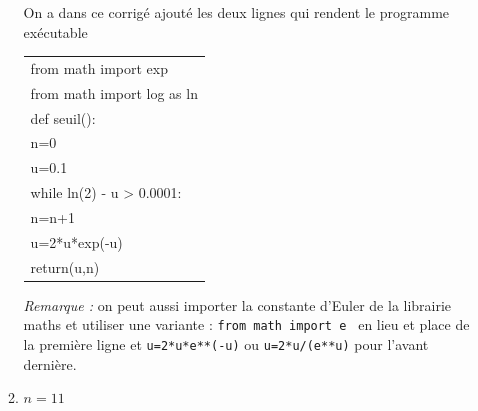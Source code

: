 \documentclass[10pt]{article}
\providecommand{\red}{\color{red}}
\providecommand{\red}{\color{red}}
\begin{document}
\begin{enumerate}
\begin{enumerate}
On a dans ce corrigé ajouté les deux lignes qui rendent le programme exécutable

	\begin{center}
		\ttfamily
		\begin{tabularx}{10cm}{|X|}\hline
			from math import exp\\
			from math import log as ln\\
			def seuil():\\
			\quad n=0\\
			\quad u=0.1\\
			\quad while ln(2) - u {\red >} 0.0001:\\
			\quad \quad n=n+1\\
			\quad \quad u={\red 2*u*exp(-u)}\\
			\quad return(u,n)\\ \hline
		\end{tabularx}
	\end{center}

\emph{Remarque :} on peut aussi importer la constante d'Euler de la librairie maths et utiliser une variante :
			\texttt{from math import e } en lieu et place de la première ligne et
			\texttt{u={\red 2*u*e**(-u)}} ou \texttt{u={\red 2*u/(e**u)}} pour l'avant dernière.
			\item $n = 11$	
		\end{enumerate}
	\end{enumerate}
\end{document}
